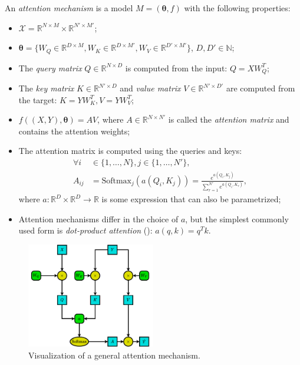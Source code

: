 \begin{definition}
An \emph{attention mechanism} is a model $M=(\pmb{\theta}, f)$ with the following properties:
\begin{itemize}
\item $\mathcal{X}=\mathbb{R}^{N \times M} \times \mathbb{R}^{N' \times M'}$; 
\item $\pmb{\theta}=\{W_Q \in \mathbb{R}^{D \times M}, W_K \in \mathbb{R}^{D \times M'}, W_V \in \mathbb{R}^{D' \times M'}\}$, $D, D' \in \mathbb{N}$;
\item The \emph{query matrix} $Q \in \mathbb{R}^{N \times D}$ is computed from the input: $Q = X W_Q^T$;
\item The \emph{key matrix} $K \in \mathbb{R}^{N' \times D}$ and \emph{value matrix} $V \in \mathbb{R}^{N' \times D'}$ are computed from the target: $K=Y W_K^T, V=Y W_V^T$;
\item $f((X, Y), \pmb{\theta}) = A V$, where $A \in \mathbb{R}^{N \times N'}$ is called the \emph{attention matrix} and contains the attention weights;
\item The attention matrix is computed using the queries and keys: 
\begin{align}
\forall i &\in \{1,\dots,N\}, j \in \{1,\dots,N'\}, \nonumber \\
A_{ij}&=\text{Softmax}_j(a(Q_i,K_j))=\frac{e^{a(Q_i,K_j)}}{\sum_{r=1}^{N'}{e^{a(Q_i,K_r)}}},
\end{align}
where $a: \mathbb{R}^D \times \mathbb{R}^D \to \mathbb{R}$ is some expression that can also be parametrized;
\item Attention mechanisms differ in the choice of $a$, but the simplest commonly used form is \emph{dot-product attention} (\cite{luong_effective_2015}): $a(q, k)=q^T k$.
\end{itemize}
\end{definition}

\begin{figure}[H]
\centering
\includegraphics[width=0.5\textwidth]{figures/background/attention.pdf}
\caption[Visualization of a general attention mechanism.]{Visualization of a general attention mechanism.}
\label{fig:attention}
\end{figure}

